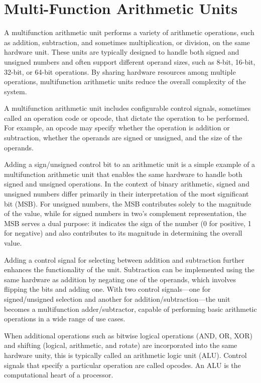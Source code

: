 \section{Multi-Function Arithmetic Units}

A multifunction arithmetic unit performs a variety of arithmetic operations, such as addition, subtraction, and sometimes multiplication, or division, on the same hardware unit. These units are typically designed to handle both signed and unsigned numbers and often support different operand sizes, such as 8-bit, 16-bit, 32-bit, or 64-bit operations. By sharing hardware resources among multiple operations, multifunction arithmetic units reduce the overall complexity of the system.

A multifunction arithmetic unit includes configurable control signals, sometimes called an operation code or opcode, that dictate the operation to be performed. For example, an opcode may specify whether the operation is addition or subtraction, whether the operands are signed or unsigned, and the size of the operands. 

 Adding a sign/unsigned control bit to an arithmetic unit is a simple example of a multifunction arithmetic unit that enables the same hardware to handle both signed and unsigned operations. In the context of binary arithmetic, signed and unsigned numbers differ primarily in their interpretation of the most significant bit (MSB). For unsigned numbers, the MSB contributes solely to the magnitude of the value, while for signed numbers in two's complement representation, the MSB serves a dual purpose: it indicates the sign of the number (0 for positive, 1 for negative) and also contributes to its magnitude in determining the overall value. 
 
 Adding a control signal for selecting between addition and subtraction further enhances the functionality of the unit. Subtraction can be implemented using the same hardware as addition by negating one of the operands, which involves flipping the bits and adding one. With two control signals—one for signed/unsigned selection and another for addition/subtraction—the unit becomes a multifunction adder/subtractor, capable of performing basic arithmetic operations in a wide range of use cases.

When additional operations such as bitwise logical operations (AND, OR, XOR) and shifting (logical, arithmetic, and rotate) are incorporated into the same hardware unity, this is typically called an arithmetic logic unit (ALU). Control signals that specify a particular operation are called opcodes. An ALU is the computational heart of a processor.

